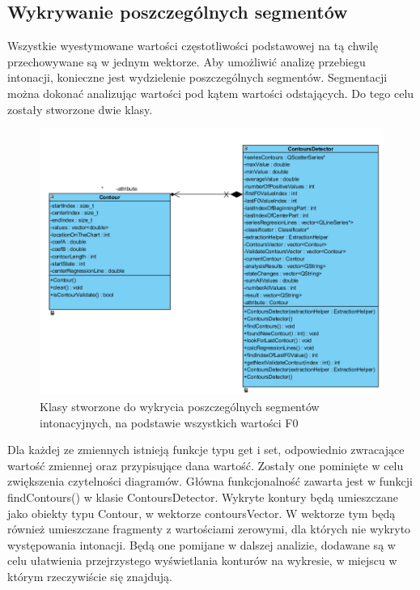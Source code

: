 \documentclass[a4paper,12 pt]{article}
\begin{document}
\subsection{Wykrywanie poszczególnych segmentów}
Wszystkie wyestymowane wartości częstotliwości podstawowej na tą chwilę przechowywane są w jednym wektorze. Aby umożliwić analizę przebiegu intonacji, konieczne jest wydzielenie poszczególnych segmentów. Segmentacji można dokonać analizując wartości pod kątem wartości odstających.
 Do tego celu zostały stworzone dwie klasy.
 \FloatBarrier
\begin{figure}[h]
\centering
\includegraphics[scale=0.9]{contourDetector.png}
\caption{Klasy stworzone do wykrycia poszczególnych segmentów intonacyjnych, na podstawie wszystkich wartości F0}
\end{figure}
\FloatBarrier
Dla każdej ze zmiennych istnieją funkcje typu get i set, odpowiednio zwracające wartość zmiennej oraz przypisujące dana wartość. Zostały one pominięte w celu zwiększenia czytelności diagramów.
Główna funkcjonalność zawarta jest w funkcji findContours() w klasie ContoursDetector. Wykryte kontury będą umieszczane jako obiekty typu Contour, w wektorze contoursVector. W wektorze tym będą również umieszczane fragmenty z wartościami zerowymi, dla których nie wykryto występowania intonacji. Będą one pomijane w dalszej analizie, dodawane są w celu ułatwienia przejrzystego wyświetlania konturów na wykresie, w miejscu w którym rzeczywiście się znajdują.
\end{document}
